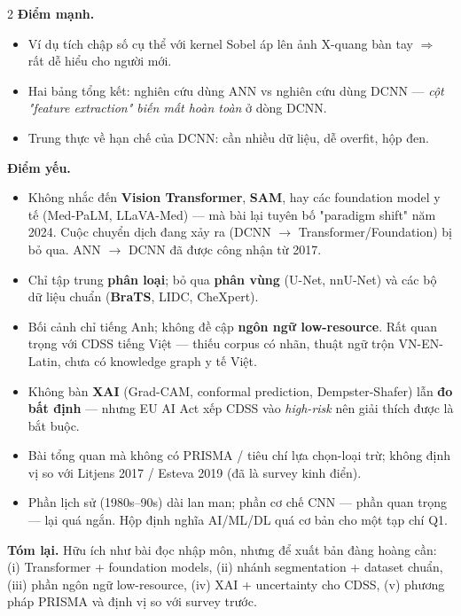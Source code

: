 \begin{paracol}{2}
\textbf{Điểm mạnh.}
\begin{itemize}[leftmargin=*,nosep]
  \item Ví dụ tích chập số cụ thể với kernel Sobel áp lên ảnh X-quang bàn tay $\Rightarrow$ rất dễ hiểu cho người mới.
  \item Hai bảng tổng kết: nghiên cứu dùng ANN vs nghiên cứu dùng DCNN — \emph{cột "feature extraction" biến mất hoàn toàn} ở dòng DCNN.
  \item Trung thực về hạn chế của DCNN: cần nhiều dữ liệu, dễ overfit, hộp đen.
\end{itemize}

\textbf{Điểm yếu.}
\begin{itemize}[leftmargin=*,nosep]
  \item Không nhắc đến \textbf{Vision Transformer}, \textbf{SAM}, hay các foundation model y tế (Med-PaLM, LLaVA-Med) — mà bài lại tuyên bố "paradigm shift" năm 2024. Cuộc chuyển dịch đang xảy ra (DCNN $\to$ Transformer/Foundation) bị bỏ qua. ANN $\to$ DCNN đã được công nhận từ 2017.
  \item Chỉ tập trung \textbf{phân loại}; bỏ qua \textbf{phân vùng} (U-Net, nnU-Net) và các bộ dữ liệu chuẩn (\textbf{BraTS}, LIDC, CheXpert).
  \item Bối cảnh chỉ tiếng Anh; không đề cập \textbf{ngôn ngữ low-resource}. Rất quan trọng với CDSS tiếng Việt — thiếu corpus có nhãn, thuật ngữ trộn VN-EN-Latin, chưa có knowledge graph y tế Việt.
  \item Không bàn \textbf{XAI} (Grad-CAM, conformal prediction, Dempster-Shafer) lẫn \textbf{đo bất định} — nhưng EU AI Act xếp CDSS vào \emph{high-risk} nên giải thích được là bắt buộc.
  \item Bài tổng quan mà không có PRISMA / tiêu chí lựa chọn-loại trừ; không định vị so với Litjens 2017 / Esteva 2019 (đã là survey kinh điển).
  \item Phần lịch sử (1980s--90s) dài lan man; phần cơ chế CNN — phần quan trọng — lại quá ngắn. Hộp định nghĩa AI/ML/DL quá cơ bản cho một tạp chí Q1.
\end{itemize}

\textbf{Tóm lại.} Hữu ích như bài đọc nhập môn, nhưng để xuất bản đàng hoàng cần: (i) Transformer + foundation models, (ii) nhánh segmentation + dataset chuẩn, (iii) phần ngôn ngữ low-resource, (iv) XAI + uncertainty cho CDSS, (v) phương pháp PRISMA và định vị so với survey trước.

\switchcolumn*


\end{paracol}
